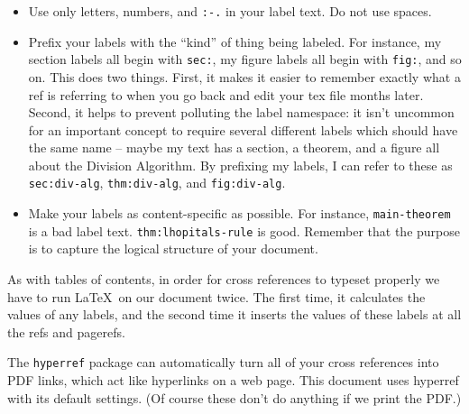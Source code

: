 \documentclass{article}
\begin{document}
\begin{itemize}
\item Use only letters, numbers, and \verb|:-.| in your label text. Do not use spaces.
\item Prefix your labels with the ``kind'' of thing being labeled. For instance, my section labels all begin with \verb|sec:|, my figure labels all begin with \verb|fig:|, and so on. This does two things. First, it makes it easier to remember exactly what a ref is referring to when you go back and edit your tex file months later. Second, it helps to prevent polluting the label namespace: it isn't uncommon for an important concept to require several different labels which should have the same name -- maybe my text has a section, a theorem, and a figure all about the Division Algorithm. By prefixing my labels, I can refer to these as \texttt{sec:div-alg}, \texttt{thm:div-alg}, and \texttt{fig:div-alg}.
\item Make your labels as content-specific as possible. For instance, \texttt{main-theorem} is a bad label text. \texttt{thm:lhopitals-rule} is good. Remember that the purpose is to capture the logical structure of your document.
\end{itemize}

As with tables of contents, in order for cross references to typeset properly we have to run \LaTeX\ on our document twice. The first time, it calculates the values of any labels, and the second time it inserts the values of these labels at all the refs and pagerefs.

The \texttt{hyperref} package can automatically turn all of your cross references into PDF links, which act like hyperlinks on a web page. This document uses hyperref with its default settings. (Of course these don't do anything if we print the PDF.)
\end{document}

